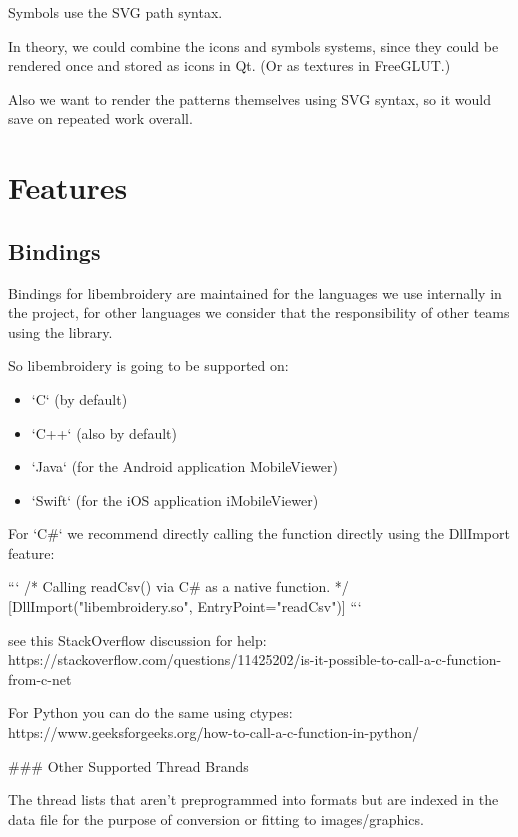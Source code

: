 
Symbols use the SVG path syntax.

In theory, we could combine the icons and symbols systems, since they could be
rendered once and stored as icons in Qt. (Or as textures in FreeGLUT.)

Also we want to render the patterns themselves using SVG syntax, so it would
save on repeated work overall.

\section{Features}

\subsection{Bindings}


Bindings for libembroidery are maintained for the languages we use internally
in the project, for other languages we consider that the responsibility of
other teams using the library.

So libembroidery is going to be supported on:

\begin{itemize}
\item `C` (by default)
\item `C++` (also by default)
\item `Java` (for the Android application MobileViewer)
\item `Swift` (for the iOS application iMobileViewer)
\end{itemize}

For `C\#`  we recommend directly calling the function directly
using the DllImport feature:

```
/* Calling readCsv() via C# as a native function. */
[DllImport("libembroidery.so", EntryPoint="readCsv")]
```

see this StackOverflow discussion for help:
https://stackoverflow.com/questions/11425202/is-it-possible-to-call-a-c-function-from-c-net

For Python you can do the same using ctypes:
https://www.geeksforgeeks.org/how-to-call-a-c-function-in-python/

### Other Supported Thread Brands


The thread lists that aren't preprogrammed into formats but are indexed in
the data file for the purpose of conversion or fitting to images/graphics.

